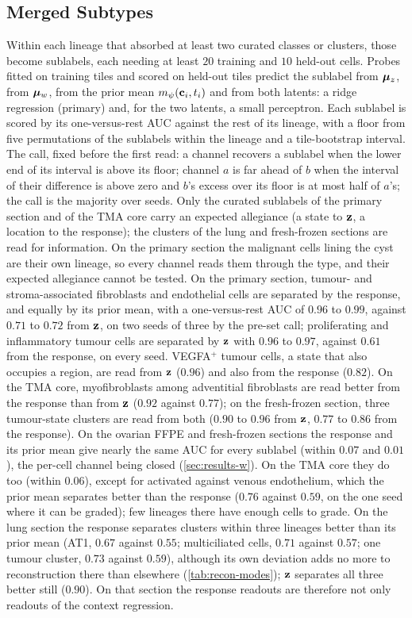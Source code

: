\subsection{Merged Subtypes}
\label{app:subtype}

Within each lineage that absorbed at least two curated classes or clusters, those become sublabels, each needing at least $20$ training and $10$ held-out cells. Probes fitted on training tiles and scored on held-out tiles predict the sublabel from $\boldsymbol{\mu}_z$, from $\boldsymbol{\mu}_w$, from the prior mean $m_{\psi}(\mathbf{c}_i, t_i)$ and from both latents: a ridge regression (primary) and, for the two latents, a small perceptron. Each sublabel is scored by its one-versus-rest AUC against the rest of its lineage, with a floor from five permutations of the sublabels within the lineage and a tile-bootstrap interval. The call, fixed before the first read: a channel recovers a sublabel when the lower end of its interval is above its floor; channel $a$ is far ahead of $b$ when the interval of their difference is above zero and $b$'s excess over its floor is at most half of $a$'s; the call is the majority over seeds. Only the curated sublabels of the primary section and of the TMA core carry an expected allegiance (a state to $\mathbf{z}$, a location to the response); the clusters of the lung and fresh-frozen sections are read for information. On the primary section the malignant cells lining the cyst are their own lineage, so every channel reads them through the type, and their expected allegiance cannot be tested. On the primary section, tumour- and stroma-associated fibroblasts and endothelial cells are separated by the response, and equally by its prior mean, with a one-versus-rest AUC of $0.96$ to $0.99$, against $0.71$ to $0.72$ from $\mathbf{z}$, on two seeds of three by the pre-set call; proliferating and inflammatory tumour cells are separated by $\mathbf{z}$ with $0.96$ to $0.97$, against $0.61$ from the response, on every seed. VEGFA$^+$ tumour cells, a state that also occupies a region, are read from $\mathbf{z}$ ($0.96$) and also from the response ($0.82$). On the TMA core, myofibroblasts among adventitial fibroblasts are read better from the response than from $\mathbf{z}$ ($0.92$ against $0.77$); on the fresh-frozen section, three tumour-state clusters are read from both ($0.90$ to $0.96$ from $\mathbf{z}$, $0.77$ to $0.86$ from the response). On the ovarian FFPE and fresh-frozen sections the response and its prior mean give nearly the same AUC for every sublabel (within $0.07$ and $0.01$), the per-cell channel being closed (\cref{sec:results-w}). On the TMA core they do too (within $0.06$), except for activated against venous endothelium, which the prior mean separates better than the response ($0.76$ against $0.59$, on the one seed where it can be graded); few lineages there have enough cells to grade. On the lung section the response separates clusters within three lineages better than its prior mean (AT1, $0.67$ against $0.55$; multiciliated cells, $0.71$ against $0.57$; one tumour cluster, $0.73$ against $0.59$), although its own deviation adds no more to reconstruction there than elsewhere (\cref{tab:recon-modes}); $\mathbf{z}$ separates all three better still ($0.90$). On that section the response readouts are therefore not only readouts of the context regression.

